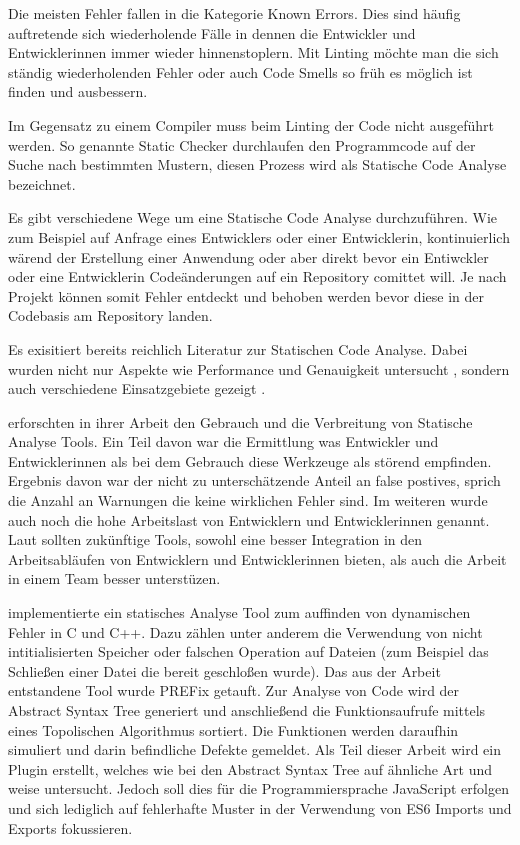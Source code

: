 Die meisten Fehler fallen in die Kategorie Known Errors. Dies sind häufig auftretende sich wiederholende Fälle in dennen die Entwickler und Entwicklerinnen immer wieder hinnenstoplern. Mit Linting möchte man die sich ständig wiederholenden Fehler oder auch Code Smells so früh es möglich ist finden und ausbessern. \autocite{Louridas2006}

Im Gegensatz zu einem Compiler muss beim Linting der Code nicht ausgeführt werden. So genannte Static Checker durchlaufen den Programmcode auf der Suche nach bestimmten Mustern, diesen Prozess wird als Statische Code Analyse bezeichnet. \autocite{Louridas2006}

Es gibt verschiedene Wege um eine Statische Code Analyse durchzuführen. Wie zum Beispiel auf Anfrage eines Entwicklers oder einer Entwicklerin, kontinuierlich wärend der Erstellung einer Anwendung oder aber direkt bevor ein Entiwckler oder eine Entwicklerin Codeänderungen auf ein Repository comittet will. Je nach Projekt können somit Fehler entdeckt und behoben werden bevor diese in der Codebasis am Repository landen.\autocite{Johnson}

Es exisitiert bereits reichlich Literatur zur Statischen Code Analyse. Dabei wurden nicht nur Aspekte wie Performance und Genauigkeit untersucht \autocite{Bessey2010}, sondern auch verschiedene Einsatzgebiete gezeigt \autocite{Bush}.

\textcite{Johnson} erforschten in ihrer Arbeit den Gebrauch und die Verbreitung von Statische Analyse Tools. Ein Teil davon war die Ermittlung was Entwickler und Entwicklerinnen als bei dem Gebrauch diese Werkzeuge als störend empfinden. Ergebnis davon war der nicht zu unterschätzende Anteil an false postives, sprich die Anzahl an Warnungen die keine wirklichen Fehler sind. Im weiteren wurde auch noch die hohe Arbeitslast von Entwicklern und Entwicklerinnen genannt. Laut \textcite{Johnson} sollten zukünftige Tools, sowohl eine besser Integration in den Arbeitsabläufen von Entwicklern und Entwicklerinnen bieten, als auch die Arbeit in einem Team besser unterstüzen.

\textcite{Bush} implementierte ein statisches Analyse Tool zum auffinden von dynamischen Fehler in C und C++. Dazu zählen unter anderem die Verwendung von nicht intitialisierten Speicher oder falschen Operation auf Dateien (zum Beispiel das Schließen einer Datei die bereit geschloßen wurde). Das aus der Arbeit entstandene Tool wurde PREFix getauft. Zur Analyse von Code wird der Abstract Syntax Tree generiert und anschließend die Funktionsaufrufe mittels eines Topolischen Algorithmus sortiert. Die Funktionen werden daraufhin simuliert und darin befindliche Defekte gemeldet. Als Teil dieser Arbeit wird ein Plugin erstellt, welches wie bei \textcite{Bush} den Abstract Syntax Tree auf ähnliche Art und weise untersucht. Jedoch soll dies für die Programmiersprache JavaScript erfolgen und sich lediglich auf fehlerhafte Muster in der Verwendung von ES6 Imports und Exports fokussieren.

